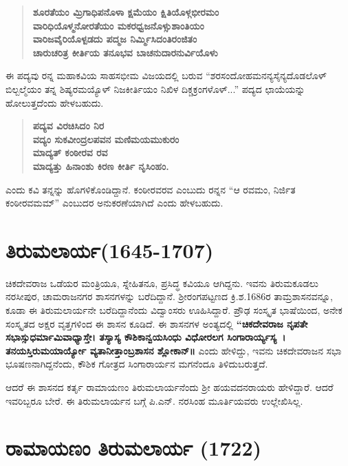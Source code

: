 \begin{verse}
\textbf{ಶೂರತೆಯಂ ಮ್ರಿಗಾಧಿಪನೊಳಾ ಕ್ಷಮೆಯಂ ಕ್ಷಿತಿಯೊಳ್ಗಭೀರಮಂ} \\\textbf{ವಾರಿಧಿಯೊಳ್ಮನೋರತೆಯಂ ಮಕರಧ್ವಜನೊಳ್ಸುಶಾಂತಿಯಂ} \\\textbf{ವಾರಿಜವೈರಿಯೊಳ್ಪಡದು ಪದ್ಮಜ ನಿರ್ಮ್ಮಿಸಿದಂತಿರಂಜಿತಂ} \\\textbf{ಚಾರುಚರಿತ್ರ ಕೀರ್ತಿಯ ತನೂಭವ ಬಾಚನುದಾರನುರ್ವಿಯೊಳು}
\end{verse}

ಈ ಪದ್ಯವು ರನ್ನ ಮಹಾಕವಿಯ ಸಾಹಸಭೀಮ ವಿಜಯದಲ್ಲಿ ಬರುವ “ಶರಸಂದೋಹಮನನ್ಯಸೈನ್ಯದೊಡಲೊಳ್​ ಬಿಲ್ಬಲ್ಮೆಯಂ ತನ್ನ ಶಿಷ್ಯರಮಯ್ಯೊಳ್​ ನಿಜಕೀರ್ತಿಯಂ ನಿಖಿಳ ದಿಕ್ಚಕ್ರಂಗಳೊಳ್​...” ಪದ್ಯದ ಛಾಯೆಯನ್ನು ಹೋಲುತ್ತದೆಂದು ಹೇಳಬಹುದು.

\begin{verse}
\textbf{ಪದ್ಯವ ವಿರಚಿಸಿದಂ ನಿರ} \\\textbf{ವದ್ಯಂ ಸುಕವೀಂದ್ರಲಪವನ ಮಣಿಮಯಮುಕುರಂ} \\\textbf{ಮಾದ್ಯತ್​ ಕಂಠೀರವ ರವ} \\\textbf{ಮಾದ್ಯತ್ತು ಹಿನಾಂಶು ಕಿರಣ ಕೀರ್ತಿ ನೃಸಿಂಹಂ.}
\end{verse}

ಎಂದು ಕವಿ ತನ್ನನ್ನು ಹೊಗಳಿಕೊಂಡಿದ್ದಾನೆ. ಕಂಠೀರವರವ ಎಂಬುದು ರನ್ನನ “ಆ ರವಮಂ, ನಿರ್ಜಿತ ಕಂಠೀರವಮಮ್” ಎಂಬುದರ ಅನುಕರಣೆಯಾಗಿದೆ ಎಂದು ಹೇಳಬಹುದು.

\section*{ತಿರುಮಲಾರ್ಯ(1645-1707)}

ಚಿಕದೇವರಾಜ ಒಡೆಯರ ಮಂತ್ರಿಯೂ, ಸ್ನೇಹಿತನೂ, ಪ್ರಸಿದ್ಧ ಕವಿಯೂ ಆಗಿದ್ದನು. ಇವನು ತಿರುಮಕೂಡಲು ನರಸೀಪುರ, ಚಾಮರಾಜನಗರ ಶಾಸನಗಳನ್ನು ಬರೆದಿದ್ದಾನೆ. ಶ‍್ರೀರಂಗಪಟ್ಟಣದ ಕ್ರಿ.ಶ.1686ರ ತಾಮ್ರಶಾಸನವನ್ನೂ, ಕೂಡಾ ಈ ತಿರುಮಲಾರ್ಯನೇ ಬರೆದಿದ್ದಾನೆಂದು ವಿದ್ವಾಂಸರು ಊಹಿಸಿದ್ದಾರೆ. ಪ್ರೌಢ ಸಂಸ್ಕೃತ ಭಾಷೆಯಿಂದ, ಅನೇಕ ಸಂಸ್ಕೃತದ ಅಕ್ಷರ ವೃತ್ತಗಳಿಂದ ಈ ಶಾಸನ ಕೂಡಿದೆ. ಈ ಶಾಸನಗಳ ಅಂತ್ಯದಲ್ಲಿ \textbf{“ಚಿಕದೇವರಾಜ ನೃಪತೇ ಸಭಾಸ್ಸುಧರ್ಮಾಮಿವಾಧ್ಯಾಸ್ತೇ। ತಸ್ಯಾಸ್ಯ ಕೌಶಿಕಾನ್ವಯಸಿಂಧು ವಿಧೋರಲಗ ಸಿಂಗಾರಾರ್ಯ್ಯಸ್ಯ~। ತನಯಸ್ತಿರುಮಯಾರ್ಯ್ಯೋ ವ್ಯತಾನೀತ್ತಾಂಬ್ರಶಾಸನ ಶ್ಲೋಕಾನ್​॥} ಎಂದು ಹೇಳಿದ್ದು, ಇವನು ಚಿಕದೇವರಾಜನ ಸಭಾ ಭೂಷಣನಾಗಿದ್ದನೆಂದು, ಕೌಶಿಕ ಗೋತ್ರದ ಸಿಂಗಾರಾರ್ಯನ ಮಗನೆಂದೂ ತಿಳಿದುಬರುತ್ತದೆ.

ಆದರೆ ಈ ಶಾಸನದ ಕರ್ತೃ ರಾಮಾಯಣಂ ತಿರುಮಲಾರ್ಯನೆಂದು ಶ‍್ರೀ ಹಯವದನರಾಯರು ಹೇಳಿದ್ದಾರೆ. ಆದರೆ ಇವರಿಬ್ಬರೂ ಬೇರೆ. ಈ ತಿರುಮಲಾರ್ಯನ ಬಗ್ಗೆ ಪಿ.ಎನ್​. ನರಸಿಂಹ ಮೂರ್ತಿಯವರು ಉಲ್ಲೇಖಿಸಿಲ್ಲ.

\section*{ರಾಮಾಯಣಂ ತಿರುಮಲಾರ್ಯ (1722)}

